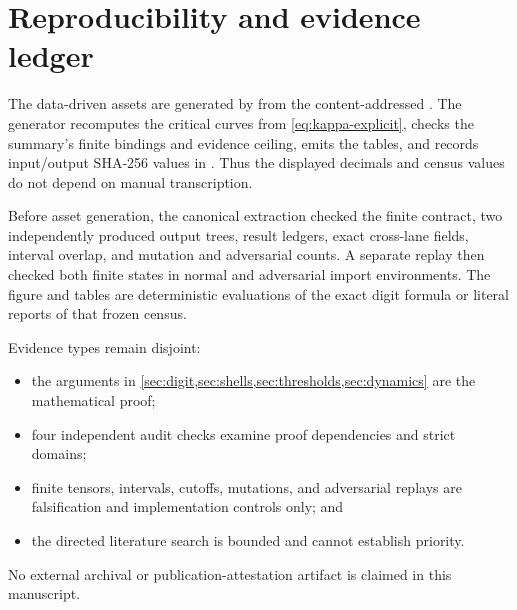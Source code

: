\section{Reproducibility and evidence ledger}
\label{app:reproducibility}

The data-driven assets are generated by
 from the content-addressed
.  The generator recomputes the
critical curves from \cref{eq:kappa-explicit}, checks the summary's finite
bindings and evidence ceiling, emits the tables, and records input/output
SHA-256 values in .  Thus the
displayed decimals and census values do not depend on manual transcription.

Before asset generation, the canonical extraction checked the finite
contract, two independently produced output trees, result ledgers, exact
cross-lane fields, interval overlap, and mutation and adversarial counts.
A separate replay then checked both finite states in normal and adversarial
import environments.  The figure and tables are deterministic evaluations
of the exact digit formula or literal reports of that frozen census.

Evidence types remain disjoint:
\begin{itemize}
  \item the arguments in \cref{sec:digit,sec:shells,sec:thresholds,sec:dynamics}
  are the mathematical proof;
  \item four independent audit checks examine proof dependencies and strict
  domains;
  \item finite tensors, intervals, cutoffs, mutations, and adversarial replays
  are falsification and implementation controls only; and
  \item the directed literature search is bounded and cannot establish
  priority.
\end{itemize}

No external archival or publication-attestation artifact is claimed in
this manuscript.
